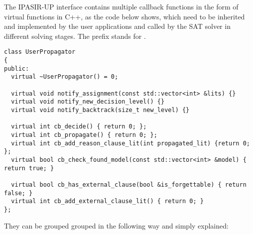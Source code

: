 The IPASIR-UP interface contains multiple callback functions in the form of virtual functions in C++, as the code below shows, which need to be inherited and implemented by the user applications and called by the SAT solver in different solving stages. The  prefix stands for .

\begin{lstlisting}
class UserPropagator
{
public:
  virtual ~UserPropagator() = 0;

  virtual void notify_assignment(const std::vector<int> &lits) {}
  virtual void notify_new_decision_level() {}
  virtual void notify_backtrack(size_t new_level) {}

  virtual int cb_decide() { return 0; };
  virtual int cb_propagate() { return 0; };
  virtual int cb_add_reason_clause_lit(int propagated_lit) {return 0; };
  virtual bool cb_check_found_model(const std::vector<int> &model) { return true; }

  virtual bool cb_has_external_clause(bool &is_forgettable) { return false; }
  virtual int cb_add_external_clause_lit() { return 0; }
};
\end{lstlisting}

They can be grouped grouped in the following way and simply explained:

